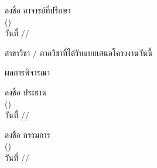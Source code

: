\documentclass[12pt,a4paper]{article}
\newcommand{\textlight}[1]{{\thailightfont #1}}
\newcommand{\dotrule}[1]{\hdashrule{#1}{0.6pt}{1pt}}
\begin{document}
\vspace{0.5cm}

\hfill\begin{minipage}{10cm}
    \vspace{0.5cm}
    \begin{center}
        \textlight{ลงชื่อ \dotrule{150pt} อาจารย์ที่ปรึกษา}\\[0.2cm]
        \textlight{(\dotrule{180pt})}\\[0.4cm]
        \textlight{วันที่ \dotrule{50pt}/\dotrule{50pt}/\dotrule{50pt}}
    \end{center}
    \vspace{0.5cm}
\end{minipage}                          

\vspace{13cm}

\textlight{สาขาวิชา / ภาควิชาที่ได้รับแบบเสนอโครงงานวันนี้ \dotrule{260pt}}

\textlight{ผลการพิจารณา}
\dotrule{422pt}

\dotrule{500pt}

\dotrule{500pt}

\vspace{2cm}

\hfill\begin{minipage}{8cm}
    \vspace{0.5cm}
    \begin{center}
        \textlight{ลงชื่อ \dotrule{150pt} ประธาน}\\[0.2cm]
        \textlight{(\dotrule{180pt})}\\[0.4cm]
        \textlight{วันที่ \dotrule{50pt}/\dotrule{50pt}/\dotrule{50pt}}
    \end{center}
    \vspace{0.5cm}
\end{minipage}  

\hfill\begin{minipage}{8cm}
    \vspace{0.5cm}
    \begin{center}
        \textlight{ลงชื่อ \dotrule{150pt} กรรมการ}\\[0.2cm]
        \textlight{(\dotrule{180pt})}\\[0.4cm]
        \textlight{วันที่ \dotrule{50pt}/\dotrule{50pt}/\dotrule{50pt}}
    \end{center}
    \vspace{0.5cm}
\end{minipage}
\end{document}
